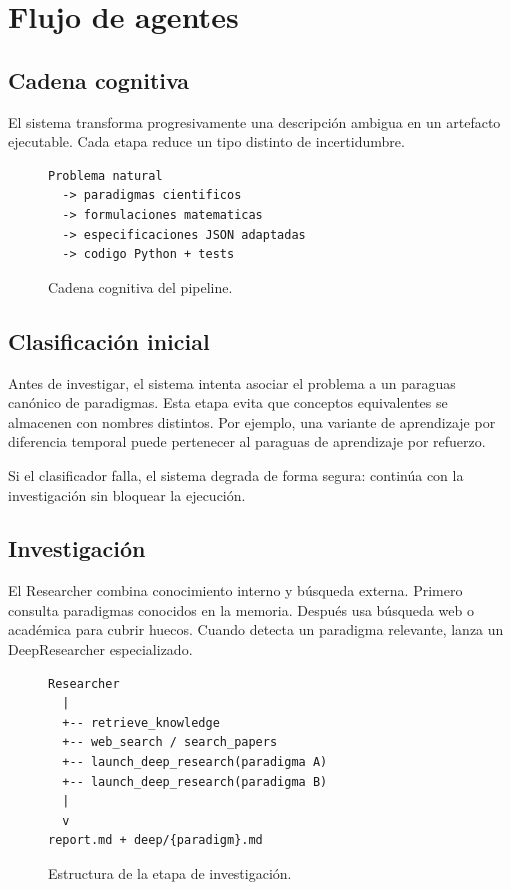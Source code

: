 \chapter{Flujo de agentes}

\section{Cadena cognitiva}

El sistema transforma progresivamente una descripción ambigua en un artefacto
ejecutable. Cada etapa reduce un tipo distinto de incertidumbre.

\begin{figure}[H]
\centering
\begin{verbatim}
Problema natural
  -> paradigmas cientificos
  -> formulaciones matematicas
  -> especificaciones JSON adaptadas
  -> codigo Python + tests
\end{verbatim}
\caption{Cadena cognitiva del pipeline.}
\end{figure}

\section{Clasificación inicial}

Antes de investigar, el sistema intenta asociar el problema a un paraguas
canónico de paradigmas. Esta etapa evita que conceptos equivalentes se almacenen
con nombres distintos. Por ejemplo, una variante de aprendizaje por diferencia
temporal puede pertenecer al paraguas de aprendizaje por refuerzo.

Si el clasificador falla, el sistema degrada de forma segura: continúa con la
investigación sin bloquear la ejecución.

\section{Investigación}

El Researcher combina conocimiento interno y búsqueda externa. Primero consulta
paradigmas conocidos en la memoria. Después usa búsqueda web o académica para
cubrir huecos. Cuando detecta un paradigma relevante, lanza un DeepResearcher
especializado.

\begin{figure}[H]
\centering
\begin{verbatim}
Researcher
  |
  +-- retrieve_knowledge
  +-- web_search / search_papers
  +-- launch_deep_research(paradigma A)
  +-- launch_deep_research(paradigma B)
  |
  v
report.md + deep/{paradigm}.md
\end{verbatim}
\caption{Estructura de la etapa de investigación.}
\end{figure}

